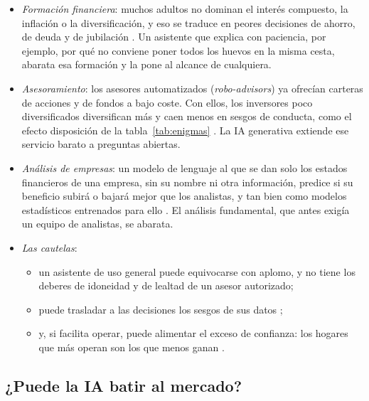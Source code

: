 \documentclass[11pt]{article}
\begin{document}
\begin{itemize}
\item \emph{Formación financiera}: muchos adultos no dominan el interés compuesto, la inflación o la diversificación, y eso se traduce en peores decisiones de ahorro, de deuda y de jubilación \parencite{LusardiMitchell2014Economic}. Un asistente que explica con paciencia, por ejemplo, por qué no conviene poner todos los huevos en la misma cesta, abarata esa formación y la pone al alcance de cualquiera.
\item \emph{Asesoramiento}: los asesores automatizados (\emph{robo-advisors}) ya ofrecían carteras de acciones y de fondos a bajo coste. Con ellos, los inversores poco diversificados diversifican más y caen menos en sesgos de conducta, como el efecto disposición de la tabla~\ref{tab:enigmas} \parencite{DAcuntoEtAl2019Promises}. La IA generativa extiende ese servicio barato a preguntas abiertas.
\item \emph{Análisis de empresas}: un modelo de lenguaje al que se dan solo los estados financieros de una empresa, sin su nombre ni otra información, predice si su beneficio subirá o bajará mejor que los analistas, y tan bien como modelos estadísticos entrenados para ello \parencite{KimMuhnNikolaev2024Financial}. El análisis fundamental, que antes exigía un equipo de analistas, se abarata.
\item \emph{Las cautelas}:
  \begin{itemize}
  \item un asistente de uso general puede equivocarse con aplomo, y no tiene los deberes de idoneidad y de lealtad de un asesor autorizado;
  \item puede trasladar a las decisiones los sesgos de sus datos \parencite{BIS2024AER};
  \item y, si facilita operar, puede alimentar el exceso de confianza: los hogares que más operan son los que menos ganan \parencite{BarberOdean2000}.
  \end{itemize}
\end{itemize}

\subsection{¿Puede la IA batir al mercado?}
\end{document}
